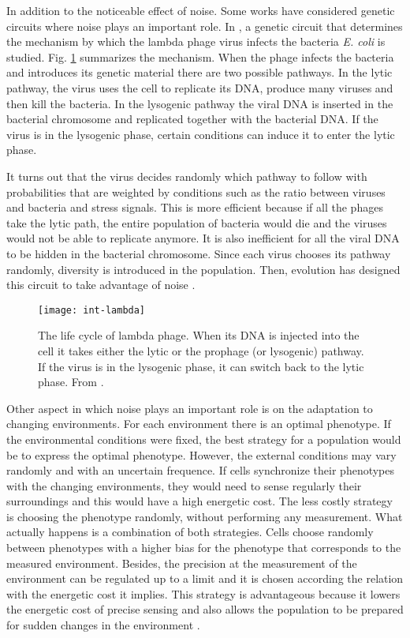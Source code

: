 In addition to the noticeable effect of noise. Some works have considered genetic circuits where noise plays an important role. In \cite{arkin98}, a genetic circuit that determines the mechanism by which the lambda phage virus infects the bacteria \textit{E. coli} is studied. Fig. \ref{fig:int-lambda} summarizes the mechanism. When the phage infects the bacteria and introduces its genetic material there are two possible pathways. In the lytic pathway, the virus uses the cell to replicate its DNA, produce many viruses and then kill the bacteria. In the lysogenic pathway the viral DNA is inserted in the bacterial chromosome and replicated together with the bacterial DNA. If the virus is in the lysogenic phase, certain conditions can induce it to enter the lytic phase.

It turns out that the virus decides randomly which pathway to follow with probabilities that are weighted by conditions such as the ratio between viruses and bacteria and stress signals. This is more efficient because if all the phages take the lytic path, the entire population of bacteria would die and the viruses would not be able to replicate anymore. It is also inefficient for all the viral DNA to be hidden in the bacterial chromosome. Since each virus chooses its pathway randomly, diversity is introduced in the population. Then, evolution has designed this circuit to take advantage of noise \cite{arkin98}.

\begin{figure}[H]
  \centering
  \texttt{[image: int-lambda]}
  \caption[Life cycle of lambda phage]{\label{fig:int-lambda} The life cycle of lambda phage. When its DNA is injected into the cell it takes either the lytic or the prophage (or lysogenic) pathway. If the virus is in the lysogenic phase, it can switch back to the lytic phase. From \cite{alberts08}.}
\end{figure}

Other aspect in which noise plays an important role is on the adaptation to changing environments. For each environment there is an optimal phenotype. If the environmental conditions were fixed, the best strategy for a population would be to express the optimal phenotype. However, the external conditions may vary randomly and with an uncertain frequence. If cells synchronize their phenotypes with the changing environments, they would need to sense regularly their surroundings and this would have a high energetic cost. The less costly strategy is choosing the phenotype randomly, without performing any measurement. What actually happens is a combination of both strategies. Cells choose randomly between phenotypes with a higher bias for the phenotype that corresponds to the measured environment. Besides, the precision at the measurement of the environment can be regulated up to a limit and it is chosen according the relation with the energetic cost it implies. This strategy is advantageous because it lowers the energetic cost of precise sensing and also allows the population to be prepared for sudden changes in the environment \cite{kussell05}.

